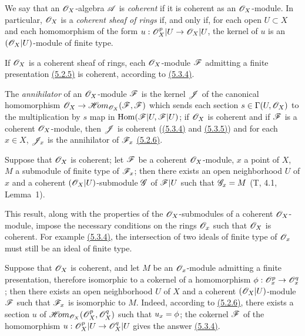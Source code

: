 \begin{env}[5.3.7]
\label{env-0.5.3.7}
We say that an $\mathscr{O}_X$-algebra $\mathscr{A}$ is {\em coherent} if it is coherent as an
$\mathscr{O}_X$-module. In particular, $\mathscr{O}_X$ is a {\em coherent sheaf of rings} if, and only if,
for each open $U\subset X$ and each homomorphism of the form $u:\mathscr{O}_X^p|U\to\mathscr{O}_X|U$, the
kernel of $u$ is an $(\mathscr{O}_X|U)$-module of finite type.

If $\mathscr{O}_X$ is a coherent sheaf of rings, each $\mathscr{O}_X$-module $\mathscr{F}$ admitting a finite
presentation \hyperref[env-0.5.2.5]{(5.2.5)} is coherent, according to \hyperref[env-0.5.3.4]{(5.3.4)}.

The {\em annihilator} of an $\mathscr{O}_X$-module $\mathscr{F}$ is the kernel $\mathscr{J}$ of the canonical
homomorphism $\mathscr{O}_X\to\mathscr{H}\!{om}_{\mathscr{O}_X}(\mathscr{F},\mathscr{F})$ which sends each section
$s\in\Gamma(U,\mathscr{O}_X)$ to the multiplication by $s$ map in ${\mathop{\mathrm{Hom}}\nolimits}(\mathscr{F}|U,\mathscr{F}|U)$; if
$\mathscr{O}_X$ is coherent and if $\mathscr{F}$ is a coherent $\mathscr{O}_X$-module, then $\mathscr{J}$ is coherent
(\hyperref[env-0.5.3.4]{(5.3.4)} and \hyperref[env-0.5.3.5]{(5.3.5)}) and for each $x\in X$, $\mathscr{J}_x$ is the
annihilator of $\mathscr{F}_x$ \hyperref[env-0.5.2.6]{(5.2.6)}.
\end{env}

\begin{env}[5.3.8]
\label{env-0.5.3.8}
Suppose that $\mathscr{O}_X$ is coherent; let $\mathscr{F}$ be a coherent $\mathscr{O}_X$-module, $x$ a point of
$X$, $M$ a submodule of finite type of $\mathscr{F}_x$; then there exists an open neighborhood $U$
of $x$ and a coherent $(\mathscr{O}_X|U)$-submodule $\mathscr{G}$ of $\mathscr{F}|U$ such that $\mathscr{G}_x=M$
(T, 4.1, Lemma~1).

This result, along with the properties of the $\mathscr{O}_X$-submodules of a coherent
$\mathscr{O}_X$-module, impose the necessary conditions on the rings $\mathscr{O}_x$ such that
$\mathscr{O}_X$ is coherent. For example \hyperref[env-0.5.3.4]{(5.3.4)}, the intersection of two
ideals of finite type of $\mathscr{O}_x$ must still be an ideal of finite type.
\end{env}

\begin{env}[5.3.9]
\label{env-0.5.3.9}
Suppose that $\mathscr{O}_X$ is coherent, and let $M$ be an $\mathscr{O}_x$-module admitting a
finite presentation, therefore isomorphic to a cokernel of a homomorphism
$\phi:\mathscr{O}_x^p\to\mathscr{O}_x^q$; then there exists an open neighborhood $U$ of $X$ and
a coherent $(\mathscr{O}_X|U)$-module $\mathscr{F}$ such that $\mathscr{F}_x$ is isomorphic to
$M$. Indeed, according to \hyperref[env-0.5.2.6]{(5.2.6)}, there exists a section $u$ of
$\mathscr{H}\!{om}_{\mathscr{O}_X}(\mathscr{O}_X^p,\mathscr{O}_X^q)$ such that $u_x=\phi$; the cokernel $\mathscr{F}$
of the homomorphism $u:\mathscr{O}_X^p|U\to\mathscr{O}_X^q|U$ gives the answer
\hyperref[env-0.5.3.4]{(5.3.4)}.
\end{env}

